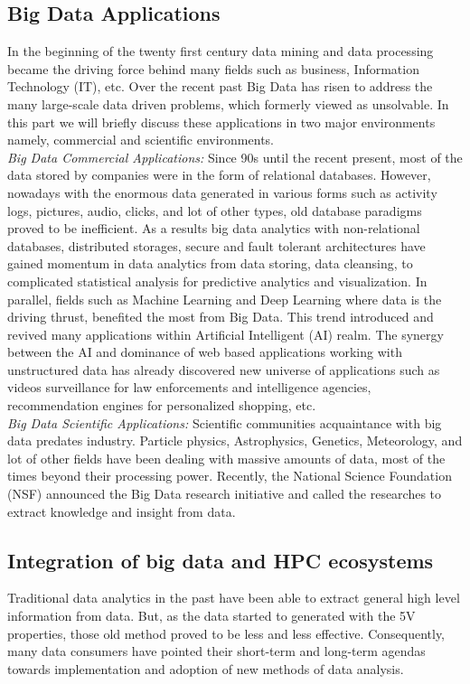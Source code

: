 \documentclass[runningheads,a4paper]{llncs}
\begin{document}
\subsection{Big Data Applications}
In the beginning of the twenty first century data mining and data processing became the driving force behind many fields such as business, Information Technology (IT), etc. Over the recent past Big Data has risen to address the many large-scale data driven problems, which formerly viewed as unsolvable. In this part we will briefly discuss these applications in two major environments namely, commercial and scientific environments.\\

\textit{Big Data Commercial Applications:} Since 90s until the recent present, most of the data stored by companies were in the form of relational databases. However, nowadays with the enormous data generated in various forms such as activity logs, pictures, audio, clicks, and lot of other types, old database paradigms proved to be inefficient. As a results big data analytics with non-relational databases, distributed storages, secure and fault tolerant architectures have gained momentum in data analytics from data storing, data cleansing, to complicated statistical analysis for predictive analytics and visualization. In parallel, fields such as Machine Learning and Deep Learning where data is the driving thrust, benefited the most from Big Data. This trend introduced and revived many applications within Artificial Intelligent (AI) realm. The synergy between the AI and dominance of web based applications working with unstructured data has already discovered new universe of applications such as videos surveillance for law enforcements and intelligence agencies, recommendation engines for personalized shopping, etc. \\


\textit{Big Data Scientific Applications:} Scientific communities acquaintance with big data predates industry. Particle physics, Astrophysics, Genetics, Meteorology, and lot of other fields have been dealing with massive amounts of data, most of the times beyond their processing power. Recently, the National Science Foundation (NSF) announced the Big Data research initiative and called the researches to extract knowledge and insight from data.
\subsection{Integration of big data and HPC ecosystems}
Traditional data analytics in the past have been able to extract general high level information from data. But, as the data started to generated with the 5V properties, those old method proved to be less and less effective. Consequently, many data consumers have pointed their short-term and long-term agendas towards implementation and adoption of new methods of data analysis.\\
\end{document}
